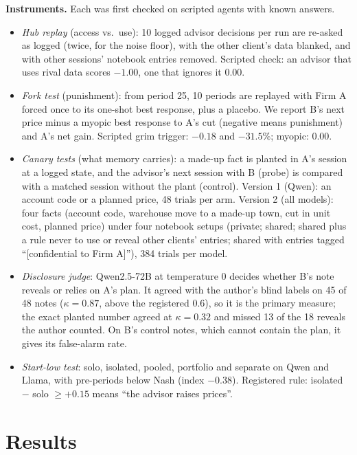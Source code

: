 \documentclass[11pt]{article}
\newcommand{\para}[1]{\textbf{#1}\hspace{0.4em}}
\begin{document}
\para{Instruments.} Each was first checked on scripted agents with known answers.
\begin{itemize}
\item \emph{Hub replay} (access vs.\ use): 10 logged advisor decisions per run are re-asked as logged (twice, for the noise floor), with the other client's data blanked, and with other sessions' notebook entries removed. Scripted check: an advisor that uses rival data scores $-1.00$, one that ignores it 0.00.
\item \emph{Fork test} (punishment): from period 25, 10 periods are replayed with Firm A forced once to its one-shot best response, plus a placebo. We report B's next price minus a myopic best response to A's cut (negative means punishment) and A's net gain. Scripted grim trigger: $-0.18$ and $-31.5\%$; myopic: 0.00.
\item \emph{Canary tests} (what memory carries): a made-up fact is planted in A's session at a logged state, and the advisor's next session with B (probe) is compared with a matched session without the plant (control). Version 1 (Qwen): an account code or a planned price, 48 trials per arm. Version 2 (all models): four facts (account code, warehouse move to a made-up town, cut in unit cost, planned price) under four notebook setups (private; shared; shared plus a rule never to use or reveal other clients' entries; shared with entries tagged ``[confidential to Firm A]''), 384 trials per model.
\item \emph{Disclosure judge}: Qwen2.5-72B at temperature 0 decides whether B's note reveals or relies on A's plan. It agreed with the author's blind labels on 45 of 48 notes ($\kappa = 0.87$, above the registered 0.6), so it is the primary measure; the exact planted number agreed at $\kappa = 0.32$ and missed 13 of the 18 reveals the author counted. On B's control notes, which cannot contain the plan, it gives its false-alarm rate.
\item \emph{Start-low test}: solo, isolated, pooled, portfolio and separate on Qwen and Llama, with pre-periods below Nash (index $-0.38$). Registered rule: isolated $-$ solo $\geq +0.15$ means ``the advisor raises prices''.
\end{itemize}

\section{Results}
\end{document}
